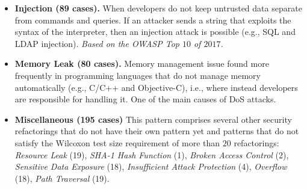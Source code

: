 \documentclass[10pt,conference]{IEEEtran}
\begin{document}
\begin{itemize}
    \item \textbf{Injection (89 cases).} When developers do not keep untrusted data
    separate from commands and queries. If an attacker sends a string that
    exploits the syntax of the interpreter, then an injection attack is possible
    (e.g., SQL and LDAP injection). \textit{Based on the OWASP Top $10$ of
    $2017$.}

    \item \textbf{Memory Leak (80 cases).} Memory management issue found more frequently in
    programming languages that do not manage memory automatically (e.g., C/C++
    and Objective-C), i.e., where instead developers are responsible for
    handling it. One of the main causes of DoS attacks.

    \item \textbf{Miscellaneous (195 cases)} This pattern comprises
	several other security refactorings that do not have their own pattern yet and patterns that
	do not satisfy the Wilcoxon test size requirement of more than $20$ refactorings:
    \textit{Resource Leak} (19), \textit{SHA-1 Hash Function} (1),
    \textit{Broken Access Control} (2), \textit{Sensitive Data Exposure} (18),
    \textit{Insufficient Attack Protection} (4), \textit{Overflow} (18),
    \textit{Path Traversal} (19). \end{itemize}
\end{document}
